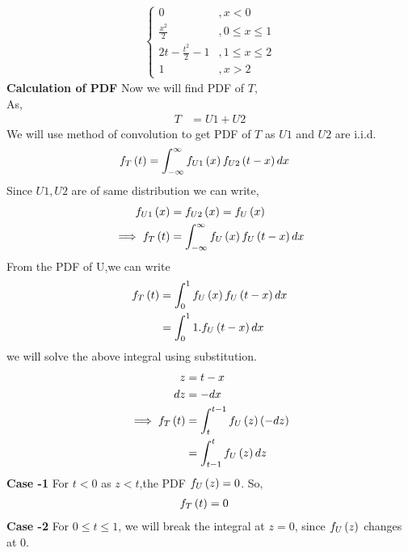 \documentclass[journal,12pt,twocolumn]{IEEEtran}
\begin{document}
\begin{enumerate}[label=\thesection.\arabic*
,ref=\thesection.\theenumi]
\begin{enumerate}[label=\thesection.\arabic*
,ref=\thesection.\theenumi]
\begin{align}
\begin{cases}
                                   0                      &,   x <0\\
                                \frac{x^{2}}{2}           &, 0\leq x \leq 1\\
                                2t - \frac{t^{2}}{2} - 1  &, 1 \leq x \leq 2\\
                                   1                      &,   x > 2
                              \end{cases}
    \end{align}      
 \textbf{Calculation of PDF}                
 Now we will find PDF of $T$,\\
 As,
   \begin{align}
           T &= U1 + U2
   \end{align}
  We will use method of convolution to get PDF of $T$ as $ U1$ and $U2$ are i.i.d.
   \begin{align}
          f_{T}\left(t\right) &= \int_{-\infty}^{\infty}f_{U1}\left(x\right)f_{U2}\left(t-x\right)dx
   \end{align}
  Since $ U1,U2$ are of same distribution we can write,
   \begin{align}
           f_{U1}\left(x\right) &= f_{U2}\left(x\right) = f_{U}\left(x\right)\\
           \implies f_{T}\left(t\right) &= \int_{-\infty}^{\infty}f_{U}\left(x\right)f_{U}\left(t-x\right)dx
   \end{align}
 From the PDF of U,we can write
  \begin{align}
          f_{T}\left(t\right) &= \int_{0}^{1}f_{U}\left(x\right)f_{U}\left(t-x\right)dx\\
                        &= \int_{0}^{1}1.f_{U}\left(t-x\right)dx\\
  \end{align}
  we will solve the above integral using substitution.
  \begin{align}
            z &= t-x \\
           dz &= -dx \\
          \implies f_{T}\left(t\right) &= \int_{t}^{t-1}f_{U}\left(z\right)\left(-dz\right)\\
                                 &= \int_{t-1}^{t}f_{U}\left(z\right)dz
  \end{align}
 \textbf{Case -1} For $ t<0 $ as $ z <t $,the PDF $ f_{U}\left(z\right) = 0 $. So,
  \begin{align}
          f_{T}\left(t\right) &= 0
  \end{align}
 \textbf{Case -2} For $ 0 \leq t \leq 1$, we will break the integral at $z = 0$, since $f_{U}\left(z\right)$ changes at 0.

\end{enumerate}
\end{enumerate}
\end{document}
